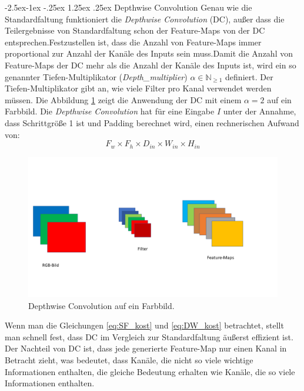 \documentclass[12pt,a4paper]{scrartcl}
\makeatletter
\numberwithin{equation}{section}
\newcommand{\N}{\mathbb{N}} %
\renewcommand\paragraph{\@startsection{paragraph}{4}{\z@}%
	{-2.5ex\@plus -1ex \@minus -.25ex}%
	{1.25ex \@plus .25ex}%
	{\normalfont\normalsize\bfseries}}
\makeatother
\begin{document}
\paragraph{Depthwise Convolution}\label{Depthwise}
Genau wie die Standardfaltung funktioniert die \textit{Depthwise Convolution} (DC), außer dass die Teilergebnisse von Standardfaltung schon der Feature-Maps von der DC entsprechen.Festzustellen ist, dass die Anzahl von Feature-Maps immer proportional zur Anzahl der Kanäle des Inputs sein muss.Damit die Anzahl von Feature-Maps der DC mehr als die Anzahl der Kanäle des Inputs ist, wird ein so genannter Tiefen-Multiplikator  (\textit{Depth\_multiplier}) $\alpha\in \N_{\ge1}$  definiert. Der Tiefen-Multiplikator gibt an, wie viele Filter pro Kanal verwendet werden müssen.  Die Abbildung \ref{fig:Depthwise_faltung} zeigt die Anwendung der DC mit einem  $ \alpha=2 $ auf ein Farbbild.
Die \textit{Depthwise Convolution} hat für eine Eingabe $ I $ unter der Annahme, dass Schrittgröße 1 ist und  Padding berechnet wird, einen rechnerischen Aufwand von:
\begin{equation}\label{eq:DW_kost}
	F_w\times F_h \times D_{in}\times W_{in}\times H_{in}
\end{equation}
\begin{figure}[h!]
	\includegraphics[width=\textwidth]{Convolution/Folie2}
	\caption{Depthwise Convolution auf ein Farbbild.}
	\label{fig:Depthwise_faltung}
\end{figure}
Wenn man die Gleichungen \ref{eq:SF_kost} und \ref{eq:DW_kost} betrachtet, stellt man schnell fest, dass DC im Vergleich zur Standardfaltung äußerst effizient ist. Der Nachteil von DC ist, dass jede generierte Feature-Map nur einen Kanal in Betracht zieht, was bedeutet, dass Kanäle, die nicht so viele wichtige Informationen enthalten, die gleiche Bedeutung erhalten wie Kanäle, die so viele Informationen enthalten.  
\end{document}
